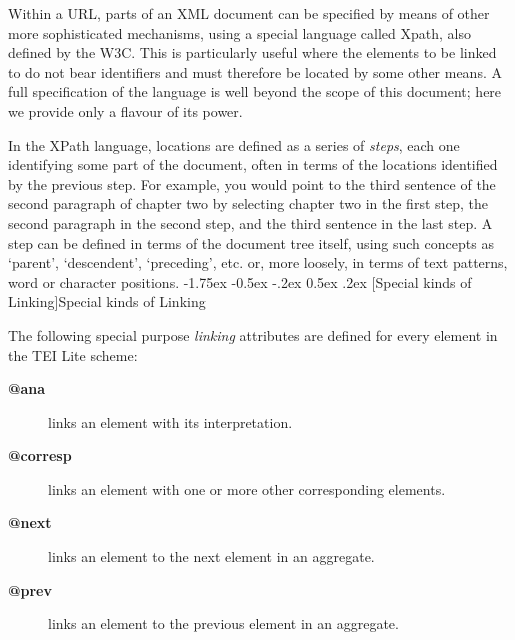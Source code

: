 \documentclass[11pt,twoside]{article}\makeatletter
\makeatletter
\renewcommand\section{\@startsection {section}{1}{\z@}%
     {-1.75ex \@plus -0.5ex \@minus -.2ex}%
     {0.5ex \@plus .2ex}%
     {\reset@font\Large\bfseries\sffamily}}
\renewcommand\subsection{\@startsection{subsection}{2}{\z@}%
     {-1.75ex\@plus -0.5ex \@minus- .2ex}%
     {0.5ex \@plus .2ex}%
     {\reset@font\Large\sffamily}}
\def\DivII{\subsection}
\def\DivII{\section}
\makeatother
\begin{document}
Within a URL, parts of an XML document can be specified by means of other more sophisticated mechanisms, using a special language called Xpath, also defined by the W3C.  This is particularly useful where the elements to be linked to do not bear identifiers and must therefore be located by some other means.  A full specification of the language is well beyond the scope of this document; here we provide only a flavour of its power. \par
In the XPath language, locations are defined as a series of \emph{steps}, each one identifying some part of the document, often in terms of the locations identified by the previous step.  For example, you would point to the third sentence of the second paragraph of chapter two by selecting chapter two in the first step, the second paragraph in the second step, and the third sentence in the last step. A step can be defined in terms of the document tree itself, using such concepts as ‘parent’, ‘descendent’, ‘preceding’, etc. or, more loosely, in terms of text patterns, word or character positions. 
\DivII[Special kinds of Linking]{Special kinds of Linking}\label{xatts}\par
The following special purpose \emph{linking} attributes are defined for every element in the TEI Lite scheme: \begin{description}

\item[\textbf{@ana}]links an element with its interpretation.
\item[\textbf{@corresp}]links an element with one or more other corresponding elements.
\item[\textbf{@next}]links an element to the next element in an aggregate.
\item[\textbf{@prev}]links an element to the previous element in an aggregate.
\end{description} \par
\end{document}

